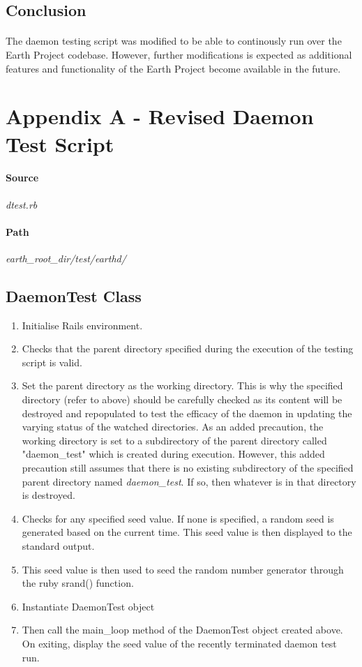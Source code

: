 \documentclass[oneside, 10pt, a4]{article}
\begin{document}
\subsection*{Conclusion}

\paragraph{}
The daemon testing script was modified to be able to continously run over the Earth Project codebase. 
However, further modifications is expected as additional features and functionality of the Earth Project become 
available in the future.

\newpage

\section*{Appendix A - Revised Daemon Test Script}

\paragraph{Source} 
\emph{dtest.rb}

\paragraph{Path}
\emph{earth\_root\_dir/test/earthd/}

\subsection*{DaemonTest Class}

\begin{enumerate}
\item Initialise Rails environment.
\item Checks that the parent directory specified during the execution of the testing script is valid.
\item Set the parent directory as the working directory. This is why the specified directory (refer to above) should be carefully checked as its content will be destroyed and repopulated to test the efficacy of the daemon in updating the varying status of the watched directories.  As an added precaution, the working directory is set to a subdirectory of the parent directory called "daemon\_test" which is created during execution. However, this added precaution still assumes that there is no existing subdirectory of the specified parent directory named \emph{daemon\_test}. If so, then whatever is in that directory is destroyed.
\item Checks for any specified seed value. If none is specified, a random seed is generated based on the current time. This seed value is then displayed to the standard output.
\item This seed value is then used to seed the random number generator through the ruby srand() function.
\item Instantiate DaemonTest object
\item Then call the main\_loop method of the DaemonTest object created above. On exiting, display the seed value of the recently terminated daemon test run.
\end{enumerate}
\end{document}
